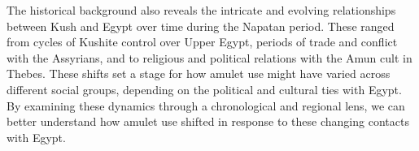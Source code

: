 The historical background also reveals the intricate and evolving relationships between Kush and Egypt over time during the Napatan period. These ranged from cycles of Kushite control over Upper Egypt, periods of trade and conflict with the Assyrians, and to religious and political relations with the Amun cult in Thebes. These shifts set a stage for how amulet use might have varied across different social groups, depending on the political and cultural ties with Egypt. By examining these dynamics through a chronological and regional lens, we can better understand how amulet use shifted in response to these changing contacts with Egypt.
